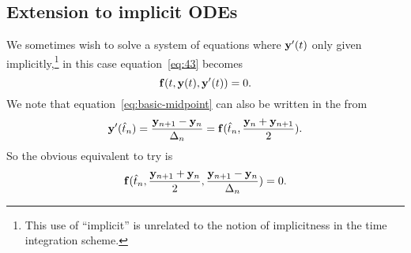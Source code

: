 



\subsection{Extension to implicit ODEs}

We sometimes wish to solve a system of equations where $\mathbf{y}'(t)$ only given implicitly,\footnote{This use of ``implicit'' is unrelated to the notion of implicitness in the time integration scheme.} in this case equation~\eqref{eq:43} becomes
\begin{equation}
  {\mathbf{f}}(t, \mathbf{y}(t), \mathbf{y}'(t)) = 0.
\end{equation}
We note that equation~\eqref{eq:basic-midpoint} can also be written in the from
\begin{equation}
  \mathbf{y}'(\hat{t}_{n}) = \frac{\mathbf{y}_{n+1} - \mathbf{y}_n}{\Delta_{n}} =  {\mathbf{f}}(\hat{t}_{n}, \frac{\mathbf{y}_n + \mathbf{y}_{n+1}}{2}).
\end{equation}
So the obvious equivalent to try is
\begin{equation}
  {\mathbf{f}}(\hat{t}_{n}, \frac{\mathbf{y}_{n+1} + \mathbf{y}_n}{2}, \frac{\mathbf{y}_{n+1} - \mathbf{y}_n}{\Delta_{n}}) = 0.
\end{equation}


